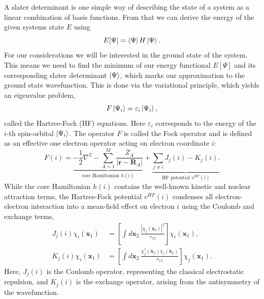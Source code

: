 A slater determinant is one simple way of describing the state of a system as a linear combination of basis functions. From that we can derive the energy of the given systems state $E$ using
\begin{equation}
    \label{eq:elec_energy}
    E[\Psi] = \bra{\Psi} H \ket{\Psi}.
\end{equation}
For our considerations we will be interested in the ground state of the system. This means we need to find the minimum of our energy functional $E[\Psi]$ and its corresponding slater determinant $\ket{\Psi}$, which marks our approximation to the ground state wavefunction. This is done via the variational principle, which yields an eigenvalue problem,
\begin{equation}
    \label{eq:hf_eigenval_equation}
    F \ket{\Psi_i} = \varepsilon_i \ket{\Psi_i},
\end{equation}
called the Hartree-Fock (HF) equations. Here $\varepsilon_i$ corresponds to the energy of the $i$-th spin-orbital $\ket{\Psi_i}$. The operator $F$ is called the Fock operator and is defined as an effective one electron operator acting on electron coordinate $i$:
\begin{equation}
    F(i) = 
    \underbrace{
        -\frac{1}{2} \nabla^2 
        - \sum_{A=1}^M \frac{Z_A}{|\mathbf{r} - \mathbf{R}_A|}
    }_{\text{core Hamiltonian } h(i)}
    + 
    \underbrace{
        \sum_{j\neq i} J_j(i) - K_j(i).
    }_{\text{HF potential }v^{HF}(i)}
\end{equation}
While the core Hamiltonian $h(i)$ contains the well-known kinetic and nuclear attraction terms, the Hartree-Fock potential $v^{HF}(i)$ condenses all electron-electron interaction into a mean-field effect on electron $i$ using the Coulomb and exchange terms,
\begin{subequations}
\begin{align}
    J_j(i)\chi_i(\mathbf{x}_1) &= \left[ \int d\mathbf{x}_2\, \frac{|\chi_j(\mathbf{x}_2)|^2}{r_{12}} \right] \chi_i(\mathbf{x}_1),\\
    K_j(i)\chi_i(\mathbf{x}_1) &= \left[ \int d\mathbf{x}_2\, \frac{\chi_j^*(\mathbf{x}_2)\chi_i(\mathbf{x}_2)}{r_{12}} \right] \chi_j(\mathbf{x}_1).
\end{align}
\end{subequations}
Here, $J_j(i)$ is the Coulomb operator, representing the classical electrostatic repulsion, and $K_j(i)$ is the exchange operator, arising from the antisymmetry of the wavefunction.

